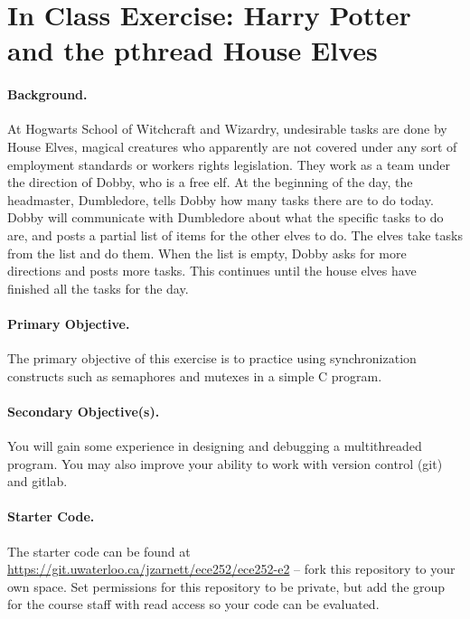 




\section*{In Class Exercise: Harry Potter and the pthread House Elves}

\paragraph{Background.}
At Hogwarts School of Witchcraft and Wizardry, undesirable tasks are done by House 
Elves, magical creatures who apparently are not covered under any sort of employment 
standards or workers rights legislation. They work as a team under the direction of 
Dobby, who is a free elf. At the beginning of the day, the headmaster, Dumbledore, tells Dobby how many tasks there are to do today. Dobby will communicate with Dumbledore about what the specific tasks to do are, and posts a partial list of items for the other elves to do. The elves take tasks from the list and do them. When the list is empty, Dobby asks for more directions and posts more tasks. This continues until the house elves have finished all the tasks for the day.

\paragraph{Primary Objective.} The primary objective of this exercise is to practice using synchronization constructs such as semaphores and mutexes in a simple C program. 

\paragraph{Secondary Objective(s).} You will gain some experience in designing and debugging a multithreaded program. You may also improve your ability to work with version control (git) and gitlab.

\paragraph{Starter Code.} The starter code can be found at \url{https://git.uwaterloo.ca/jzarnett/ece252/ece252-e2} -- fork this repository to your own space. Set permissions for this repository to be private, but add the group for the course staff with read access so your code can be evaluated. 

